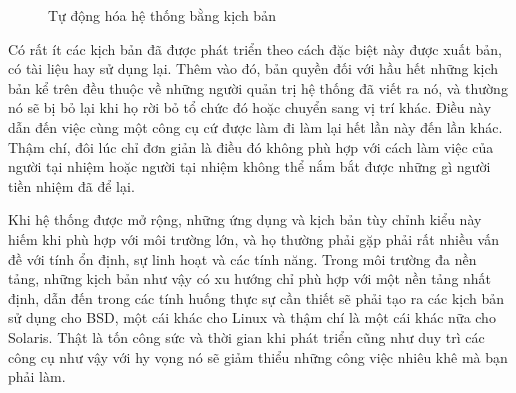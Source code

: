 \begin{figure}[htb]
    \begin{center}
    \leavevmode
    \setlength\fboxsep{0pt}
    \setlength\fboxrule{0.5pt}
    \end{center}
    \caption{Tự động hóa hệ thống bằng kịch bản}
    \label{fig:geeks_and_repetitive_tasks}
\end{figure}

Có rất ít các kịch bản đã được phát triển theo cách đặc biệt này được xuất bản, có tài liệu hay sử dụng lại. Thêm vào đó, bản quyền đối với hầu hết những kịch bản kể trên đều thuộc về những người quản trị hệ thống đã viết ra nó, và thường nó sẽ bị bỏ lại khi họ rời bỏ tổ chức đó hoặc chuyển sang vị trí khác. Điều này dẫn đến việc cùng một công cụ cứ được làm đi làm lại hết lần này đến lần khác. Thậm chí, đôi lúc chỉ đơn giản là điều đó không phù hợp với cách làm việc của người tại nhiệm hoặc người tại nhiệm không thể nắm bắt được những gì người tiền nhiệm đã để lại.

Khi hệ thống được mở rộng, những ứng dụng và kịch bản tùy chỉnh kiểu này hiếm khi phù hợp với môi trường lớn, và họ thường phải gặp phải rất nhiều vấn đề với tính ổn định, sự linh hoạt và các tính năng. Trong môi trường đa nền tảng, những kịch bản như vậy có xu hướng chỉ phù hợp với một nền tảng nhất định, dẫn đến trong các tính huống thực sự cần thiết sẽ phải tạo ra các kịch bản sử dụng cho BSD, một cái khác cho Linux và thậm chí là một cái khác nữa cho Solaris. Thật là tốn công sức và thời gian khi phát triển cũng như duy trì các công cụ như vậy với hy vọng nó sẽ giảm thiểu những công việc nhiêu khê mà bạn phải làm.

